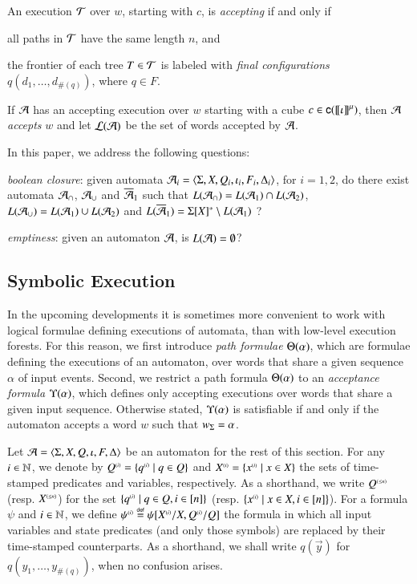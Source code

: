 \begin{definition}\label{def:accepting}
An execution $\mathcal{T}$ over $w$, starting with $c$, is \emph{accepting} if
and only if \begin{compactitem}
\item\label{it1:accepting} all paths in $\mathcal{T}$ have the same length $n$,
  and
\item\label{it2:accepting} the frontier of each tree $T \in \mathcal{T}$ is
  labeled with \emph{final configurations} $q(d_1,\ldots,d_{\#(q)})$,
  where $q \in F$.
\end{compactitem} 
If $\mathcal{A}$ has an accepting execution over $w$ starting with a cube $c
\in \mathsf{c}({{\bf [\![} \iota {\bf ]\!]}^\mu})$, then $\mathcal{A}$ \emph{accepts} $w$ and let
${\mathcal L}({\mathcal{A}})$ be the set of words accepted by $\mathcal{A}$.
\end{definition}
In this paper, we address the following questions: \begin{compactenum}
\item \emph{boolean closure}: given automata $\mathcal{A}_i =
  \langle \Sigma,X,Q_i,\iota_i,F_i,\Delta_i \rangle$, for $i=1,2$, do there
  exist automata $\mathcal{A}_\cap$, $\mathcal{A}_\cup$ and $\overline{\mathcal{A}}_1$ such that
  $L(\mathcal{A}_\cap) = L(\mathcal{A}_1) \cap L(\mathcal{A}_2)$, $L(\mathcal{A}_\cup) = L(\mathcal{A}_1) \cup
  L(\mathcal{A}_2)$ and $L(\overline{\mathcal{A}}_1) = \Sigma[X]^* \setminus L(\mathcal{A}_1)$ ?
%
\item \emph{emptiness}: given an automaton $\mathcal{A}$, is $L(\mathcal{A}) =
  \emptyset$?
\end{compactenum}

\subsection{Symbolic Execution}

In the upcoming developments it is sometimes more convenient to work
with logical formulae defining executions of automata, than with
low-level execution forests. For this reason, we first introduce
\emph{path formulae} $\Theta({\alpha})$, which are formulae defining
the executions of an automaton, over words that share a given sequence
$\alpha$ of input events.  Second, we restrict a path formula
$\Theta({\alpha})$ to an \emph{acceptance formula}
$\Upsilon({\alpha})$, which defines only accepting executions over words
that share a given input sequence. Otherwise stated,
$\Upsilon({\alpha})$ is satisfiable if and only if the automaton accepts
a word $w$ such that ${w}_\Sigma = \alpha$.

Let $\mathcal{A} = \langle \Sigma,X,Q,\iota,F,\Delta \rangle$ be an automaton for the
rest of this section. For any $i \in {\bf \mathbb{N}}$, we denote by ${Q}^{\scriptscriptstyle{({i})}}
= \{ {q}^{\scriptscriptstyle{({i})}} \mid q \in Q \}$ and ${X}^{\scriptscriptstyle{({i})}} =
\{ {x}^{\scriptscriptstyle{({i})}} \mid x \in X \}$ the sets of time-stamped predicates
and variables, respectively. As a shorthand, we write ${Q}^{\scriptscriptstyle{({\leq
  n})}}$ (resp.  ${X}^{\scriptscriptstyle{({\leq n})}}$) for the set $\{ {q}^{\scriptscriptstyle{({i})}} \mid
  q \in Q, i \in [n] \}$ (resp. $\{ {x}^{\scriptscriptstyle{({i})}} \mid x \in X, i \in
  [n] \}$). For a formula $\psi$ and $i \in {\bf \mathbb{N}}$, we define
${\psi}^{\scriptscriptstyle{({i})}} \stackrel{\scriptscriptstyle{\mathsf{def}}}{=} \psi[{X}^{\scriptscriptstyle{({i})}}/X,{Q}^{\scriptscriptstyle{({i})}}/Q]$ the
formula in which all input variables and state predicates (and only
those symbols) are replaced by their time-stamped counterparts. As a
shorthand, we shall write $q(\vec{y})$ for $q(y_1,\ldots,y_{\#(q)})$,
when no confusion arises.

